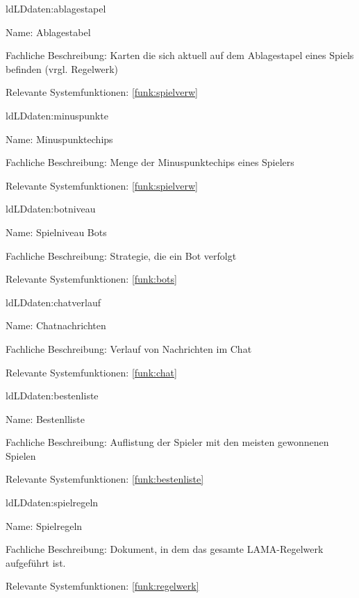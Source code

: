 \begin{description}[leftmargin=5em, style=sameline]
	\begin{lhp}{ld}{LD}{daten:ablagestapel}
		\item [Name:]Ablagestabel
		\item [Fachliche Beschreibung:]Karten die sich aktuell auf dem Ablagestapel eines Spiels befinden (vrgl. Regelwerk)
		\item [Relevante Systemfunktionen:] \ref{funk:spielverw}
	\end{lhp}
	
	\begin{lhp}{ld}{LD}{daten:minuspunkte}
		\item [Name:] Minuspunktechips
		\item [Fachliche Beschreibung:] Menge der Minuspunktechips eines Spielers
		\item [Relevante Systemfunktionen:] \ref{funk:spielverw}
	\end{lhp}
	
	\begin{lhp}{ld}{LD}{daten:botniveau}
		\item [Name:] Spielniveau Bots
		\item [Fachliche Beschreibung:] Strategie, die ein Bot verfolgt
		\item [Relevante Systemfunktionen:] \ref{funk:bots}
	\end{lhp}
	
	\begin{lhp}{ld}{LD}{daten:chatverlauf}
		\item [Name:] Chatnachrichten
		\item [Fachliche Beschreibung:]Verlauf von Nachrichten im Chat
		\item [Relevante Systemfunktionen:] \ref{funk:chat} 
	\end{lhp}
	
	\begin{lhp}{ld}{LD}{daten:bestenliste}
		\item [Name:]Bestenlliste
		\item [Fachliche Beschreibung:] Auflistung der Spieler mit den meisten gewonnenen Spielen
		\item [Relevante Systemfunktionen:] \ref{funk:bestenliste}
	\end{lhp}
	
		\begin{lhp}{ld}{LD}{daten:spielregeln}
		\item [Name:]Spielregeln
		\item [Fachliche Beschreibung:]Dokument, in dem das gesamte LAMA-Regelwerk aufgeführt ist.
		\item [Relevante Systemfunktionen:] \ref{funk:regelwerk}
	\end{lhp}
	
	
\end{description}